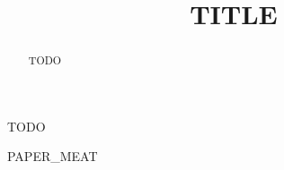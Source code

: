 \documentclass[conference]{IEEEtran}
\begin{document}
\title{TITLE}

\author{
}

\maketitle

\begin{abstract}
TODO
\end{abstract}

\begin{IEEEkeywords}
TODO
\end{IEEEkeywords}

\IEEEpeerreviewmaketitle

PAPER_MEAT




\end{document}
